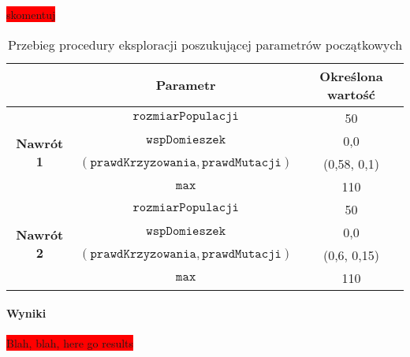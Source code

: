\documentclass[twoside]{iisthesis}
\newcommand{\todo}{\colorbox{red}}
\newcommand{\param}[1]{\mathtt{#1}}
\begin{document}
\todo{skomentuj}

\begin{table}[h]
	\caption{Przebieg procedury eksploracji poszukującej parametrów początkowych \label{table:tsp_tweak_flow}}
	\centering
	\begin{tabular}{c|c|c|}
		\cline{2-3}
		& {\bf Parametr}                                     & {\bf Określona wartość} \\ \hline
		\multicolumn{1}{|c|}{\multirow{4}{*}{{\bf Nawrót 1}}} & $\param{rozmiarPopulacji}$                         & 50                      \\ \cline{2-3} 
		\multicolumn{1}{|c|}{}                                & $\param{wspDomieszek}$                             & 0,0                     \\ \cline{2-3} 
		\multicolumn{1}{|c|}{}                                & $(\param{prawdKrzyzowania}, \param{prawdMutacji})$ & (0,58, 0,1)             \\ \cline{2-3} 
		\multicolumn{1}{|c|}{}                                & $\param{max}$                                      & 110                     \\ \hline \hline
		\multicolumn{1}{|c|}{\multirow{4}{*}{{\bf Nawrót 2}}} & $\param{rozmiarPopulacji}$                         & 50                      \\ \cline{2-3} 
		\multicolumn{1}{|c|}{}                                & $\param{wspDomieszek}$                             & 0,0                     \\ \cline{2-3} 
		\multicolumn{1}{|c|}{}                                & $(\param{prawdKrzyzowania}, \param{prawdMutacji})$ & (0,6, 0,15)             \\ \cline{2-3} 
		\multicolumn{1}{|c|}{}                                & $\param{max}$                                      & 110                     \\ \hline
	\end{tabular}
\end{table}	

\paragraph{Wyniki}
\todo{Blah, blah, here go results}
\end{document}
